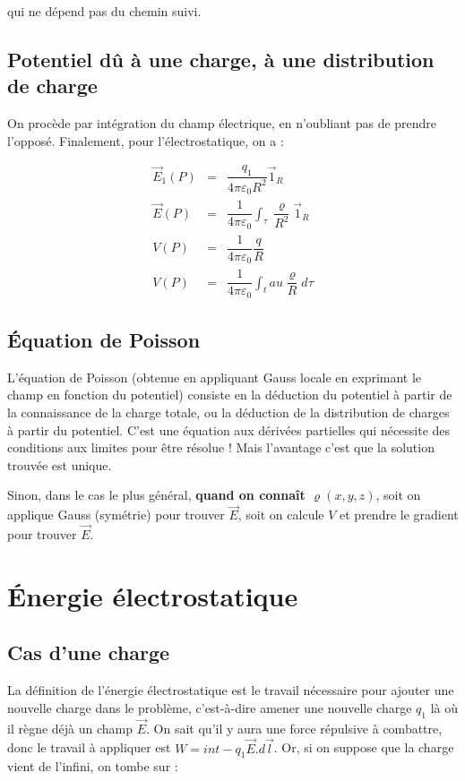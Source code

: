 \documentclass[12pt]{book}
\begin{document}
qui ne dépend pas du chemin suivi.
\subsection{Potentiel dû à une charge, à une distribution de charge}
On procède par intégration du champ électrique, en n'oubliant pas de prendre l'opposé. Finalement, pour l'électrostatique, on a :

\begin{eqnarray*}
\vec{E}_1 (P) &=& \dfrac{q_1}{4\pi \varepsilon_0 R^2} \vec{1}_R \\
\vec{E} (P) &=& \dfrac{1}{4\pi \varepsilon_0} \int_\tau
\dfrac{\varrho}{R^2} \vec{1}_R \\
V(P) &=& \dfrac{1}{4\pi \varepsilon_0} \dfrac{q}{R} \\
V(P) &=& \dfrac{1}{4\pi \varepsilon_0} \int_tau \dfrac{\varrho}{R} d\tau
\end{eqnarray*}
\subsection{Équation de Poisson}
L'équation de Poisson (obtenue en appliquant Gauss locale en exprimant le champ en fonction du potentiel) consiste en la déduction du potentiel à partir de la connaissance de la charge totale, ou la déduction de la distribution de charges à partir du potentiel. C'est une équation aux dérivées partielles qui nécessite des conditions aux limites pour être résolue ! Mais l'avantage c'est que la solution trouvée est unique.

Sinon, dans le cas le plus général, \textbf{quand on connaît $\varrho(x,y,z)$}, soit on applique Gauss (symétrie) pour trouver $\vec{E}$, soit on calcule $V$ et prendre le gradient pour trouver $\vec{E}$.
\section{Énergie électrostatique}
\subsection{Cas d'une charge}
La définition de l'énergie électrostatique est le travail nécessaire pour ajouter une nouvelle charge dans le problème, c'est-à-dire amener une nouvelle charge $q_1$ là où il règne déjà un champ $\vec{E}$. On sait qu'il y aura une force répulsive à combattre, donc le travail à appliquer est $W = int -q_1\vec{E}.d\vec{l}$. Or, si on suppose que la charge vient de l'infini, on tombe sur :
\end{document}
